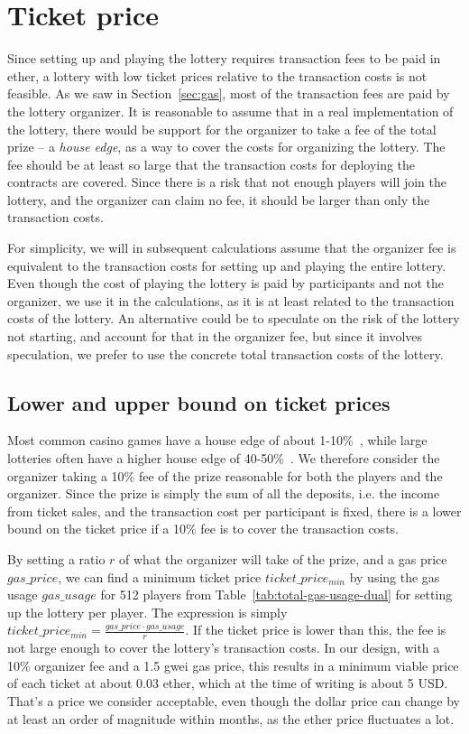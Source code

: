 \section{Ticket price}
\label{sec:ticket-price}

Since setting up and playing the lottery requires transaction fees to be paid in ether, a lottery with low ticket prices relative to the transaction costs is not feasible. As we saw in Section~\ref{sec:gas}, most of the transaction fees are paid by the lottery organizer. It is reasonable to assume that in a real implementation of the lottery, there would be support for the organizer to take a fee of the total prize – a \emph{house edge}, as a way to cover the costs for organizing the lottery. The fee should be at least so large that the transaction costs for deploying the contracts are covered. Since there is a risk that not enough players will join the lottery, and the organizer can claim no fee, it should be larger than only the transaction costs. 

For simplicity, we will in subsequent calculations assume that the organizer fee is equivalent to the transaction costs for setting up and playing the entire lottery. Even though the cost of playing the lottery is paid by participants and not the organizer, we use it in the calculations, as it is at least related to the transaction costs of the lottery. An alternative could be to speculate on the risk of the lottery not starting, and account for that in the organizer fee, but since it involves speculation, we prefer to use the concrete total transaction costs of the lottery.

\subsection{Lower and upper bound on ticket prices}
Most common casino games have a house edge of about 1-10\%~\cite{walsh_houses_nodate}, while large lotteries often have a higher house edge of 40-50\%~\cite{shackleford_house_nodate}. We therefore consider the organizer taking a 10\% fee of the prize reasonable for both the players and the organizer. Since the prize is simply the sum of all the deposits, i.e. the income from ticket sales, and the transaction cost per participant is fixed, there is a lower bound on the ticket price if a 10\% fee is to cover the transaction costs.

By setting a ratio $r$ of what the organizer will take of the prize, and a gas price $gas\_price$, we can find a minimum ticket price $ticket\_price_{min}$ by using the gas usage $gas\_usage$ for 512 players from Table~\ref{tab:total-gas-usage-dual} for setting up the lottery per player. The expression is simply $ticket\_price_{min}=\frac{gas\_price \cdot gas\_usage}{r}$. If the ticket price is lower than this, the fee is not large enough to cover the lottery's transaction costs.
In our design, with a 10\% organizer fee and a 1.5 gwei gas price, this results in a minimum viable price of each ticket at about 0.03 ether, which at the time of writing is about 5 USD. That's a price we consider acceptable, even though the dollar price can change by at least an order of magnitude within months, as the ether price fluctuates a lot.

